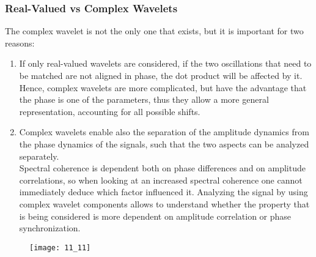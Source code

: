\subsubsection{Real-Valued vs Complex Wavelets}
The complex wavelet is not the only one that exists, but it is important for two reasons:
\begin{enumerate}
    \item If only real-valued wavelets are considered, if the two oscillations that need to be matched are not
          aligned in phase, the dot product will be affected by it. Hence, complex wavelets are more
          complicated, but have the advantage that the phase is one of the parameters, thus they
          allow a more general representation, accounting for all possible shifts.
    \item Complex wavelets enable also the separation of the amplitude dynamics from the phase dynamics of the
          signals, such that the two aspects can be analyzed separately.\\
          Spectral coherence is dependent both on phase differences and on amplitude correlations, so when looking
          at an increased spectral coherence one cannot immediately deduce which factor influenced it.
          Analyzing the signal by using complex wavelet components allows to understand whether the property
          that is being considered is more dependent on amplitude correlation or phase synchronization.
\end{enumerate}
\begin{figure}[H]
    \texttt{[image: 11\_11]}
    \centering
\end{figure}
